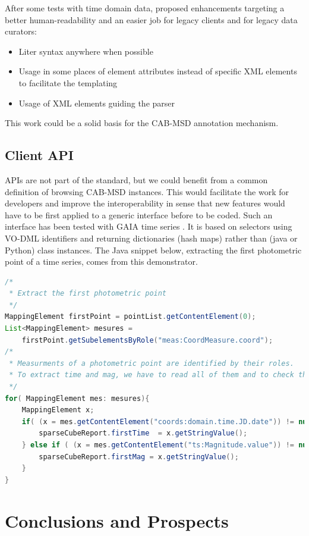 \documentclass[11pt,a4paper]{ivoa}
\begin{document}
After some tests with time domain data, \cite{talk:lmlite} \cite{talk:lmgaia} proposed enhancements targeting a better human-readability and an easier job for legacy clients and for legacy data curators:

\begin{itemize}
\item Liter syntax anywhere when possible
\item Usage in some places of element attributes instead of specific XML elements to facilitate the templating
\item Usage of XML elements guiding the parser
\end{itemize}

This work could be a solid basis for the CAB-MSD annotation mechanism.

\subsection{Client API}
APIs are not part of the standard, but we could benefit from a common definition of browsing CAB-MSD instances.  This would facilitate the work for developers and improve the interoperability in sense that new features would have to be first applied to a generic interface before to be coded.
Such an interface has been tested with GAIA time series \citep{talk:lmparser}. It is based on selectors using VO-DML identifiers and returning dictionaries (hash maps) rather than (java or Python) class instances. 
The Java snippet below, extracting the first photometric point of a time series, comes from this demonstrator. 

\begin{lstlisting}[language=java]
/*
 * Extract the first photometric point
 */
MappingElement firstPoint = pointList.getContentElement(0);		
List<MappingElement> mesures =
    firstPoint.getSubelementsByRole("meas:CoordMeasure.coord");
/*
 * Measurments of a photometric point are identified by their roles. 
 * To extract time and mag, we have to read all of them and to check the roles
 */
for( MappingElement mes: mesures){
	MappingElement x;
	if( (x = mes.getContentElement("coords:domain.time.JD.date")) != null ) {
		sparseCubeReport.firstTime  = x.getStringValue();
	} else if ( (x = mes.getContentElement("ts:Magnitude.value")) != null ) {
	    sparseCubeReport.firstMag = x.getStringValue();
	} 
}
\end{lstlisting}


\section{Conclusions and Prospects}
\end{document}

